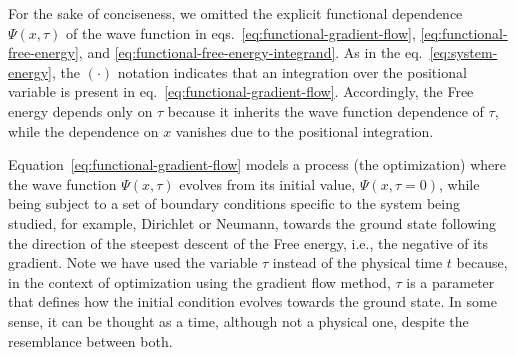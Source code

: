 \documentclass[twocolumn,showpacs,showkeys,preprintnumbers,superscriptaddress, pra, 10pt, aps]{revtex4-2}
\begin{document}
%
For the sake of conciseness, we omitted the explicit functional dependence $\Psi(x, \tau)$ of the
wave function in eqs.~\eqref{eq:functional-gradient-flow}, \eqref{eq:functional-free-energy}, and
\eqref{eq:functional-free-energy-integrand}. As in the eq.~\eqref{eq:system-energy}, the $(\cdot)$
notation indicates that an integration over the positional variable is present in
eq.~\eqref{eq:functional-gradient-flow}. Accordingly, the Free energy depends only on $\tau$ because
it inherits the wave function dependence of $\tau$, while the dependence on $x$ vanishes due to the
positional integration.

Equation~\eqref{eq:functional-gradient-flow} models a process (the
optimization) where the wave function $\Psi(x, \tau)$ evolves from its initial value, $\Psi(x, \tau
  = 0)$, while being subject to a set of boundary conditions specific to the system being studied, for
example, Dirichlet or Neumann, towards the ground state following the direction of the steepest
descent of the Free energy, i.e., the negative of its gradient. Note we have used the variable
$\tau$ instead of the physical time $t$ because, in the context of optimization using the gradient
flow method, $\tau$ is a parameter that defines how the initial condition evolves towards the ground
state. In some sense, it can be thought as a time, although not a physical one, despite the
resemblance between both.
\end{document}
